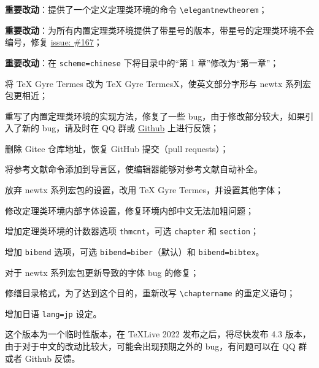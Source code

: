 \documentclass[lang=cn,newtx,10pt,scheme=chinese]{elegantbook}
\begin{document}
\begin{change}
  \item \textbf{重要改动}：提供了一个定义定理类环境的命令 \lstinline|\elegantnewtheorem|；
  \item \textbf{重要改动}：为所有内置定理类环境提供了带星号的版本，带星号的定理类环境不会编号，修复 \href{https://github.com/ElegantLaTeX/ElegantBook/issues/167}{issue: \#167}；
  \item \textbf{重要改动}：在 \lstinline{scheme=chinese} 下将目录中的“第 1 章”修改为“第一章”；
  \item 将 TeX Gyre Termes 改为 TeX Gyre TermesX，使英文部分字形与 newtx 系列宏包更相近；
  \item 重写了内置定理类环境的实现方法，修复了一些 bug，由于修改部分较大，如果引入了新的 bug，请及时在 QQ 群或 \href{https://github.com/ElegantLaTeX}{Github} 上进行反馈；
  \item 删除 Gitee 仓库地址，恢复 GitHub 提交（pull requests）；
  \item 将参考文献命令添加到导言区，使编辑器能够对参考文献自动补全。
\end{change}


\begin{change}
  \item 放弃 newtx 系列宏包的设置，改用 TeX Gyre Termes，并设置其他字体；
  \item 修改定理类环境内部字体设置，修复环境内部中文无法加粗问题；
  \item 增加定理类环境的计数器选项 \lstinline{thmcnt}，可选 \lstinline{chapter} 和 \lstinline{section}；
  \item 增加 \lstinline{bibend} 选项，可选 \lstinline{bibend=biber}（默认）和 \lstinline{bibend=bibtex}。
\end{change}




\begin{change}
  \item 对于 newtx 系列宏包更新导致的字体 bug 的修复；
  \item 修缮目录格式，为了达到这个目的，重新改写 \lstinline{\chaptername} 的重定义语句；
  \item 增加日语 \lstinline{lang=jp} 设定。
  \item 这个版本为一个临时性版本，在 \TeX Live 2022 发布之后，将尽快发布 4.3 版本，由于对于中文的改动比较大，可能会出现预期之外的 bug，有问题可以在 QQ 群或者 Github 反馈。
\end{change}
\end{document}
